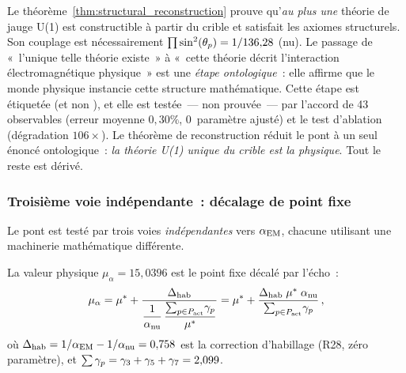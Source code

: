 \documentclass[12pt,a4paper]{article}
\begin{document}
\begin{remarque}
\label{rem:ontological_caveat_reconstruction}
Le théorème~\ref{thm:structural_reconstruction} prouve qu'\emph{au
plus une} théorie de jauge U(1) est constructible à partir du crible
et satisfait les axiomes structurels. Son couplage est nécessairement
$\prod \sin^2(\theta_{p}) = 1/136{,}28$ (nu). Le passage de «~l'unique telle
théorie existe~» à «~cette théorie décrit l'interaction
électromagnétique physique~» est une \emph{étape ontologique}~: elle
affirme que le monde physique instancie cette structure mathématique.
Cette étape est étiquetée \BRIDGETAG{} (et non \THMTAG), et elle est
testée~--- non prouvée~--- par l'accord de 43 observables (erreur
moyenne $0{,}30\%$, 0~paramètre ajusté) et le test d'ablation
(dégradation $106\times$). Le théorème de reconstruction réduit le
pont à un seul énoncé ontologique~: \emph{la théorie U(1) unique du
crible est la physique}. Tout le reste est dérivé.
\end{remarque}

\subsubsection{Troisième voie indépendante~: décalage de point fixe}
\label{sec:ch9_fp_shift}

Le pont est testé par trois voies \emph{indépendantes} vers
$\alpha_{\mathrm{EM}}$, chacune utilisant une machinerie mathématique différente.

\begin{proposition}
\label{prop:fp_shift}
La valeur physique $\mu_\alpha = 15{,}0396$ est le point fixe
décalé par l'écho~:
\begin{equation}
  \mu_\alpha
  = {\mu^{*}}
  + \frac{\Delta_{\rm hab}}
         {\displaystyle\frac{1}{\alpha_{\rm nu}}\,
          \frac{\sum_{p\in P_{\mathrm{act}}}\!\gamma_{p}}{{\mu^{*}}}}
  = {\mu^{*}}
  + \frac{\Delta_{\rm hab}\;{\mu^{*}}\;\alpha_{\rm nu}}
         {\sum_{p\in P_{\mathrm{act}}}\!\gamma_{p}}\,,
  \label{eq:mu_alpha_shift}
\end{equation}
où $\Delta_{\rm hab} = 1/\alpha_{\mathrm{EM}} - 1/\alpha_{\rm nu} = 0{,}758$ est
la correction d'habillage (R28, zéro paramètre), et
$\sum \gamma_{p} = \gamma_{3}+\gamma_{5}+\gamma_{7} = 2{,}099$.
\end{proposition}
\end{document}
